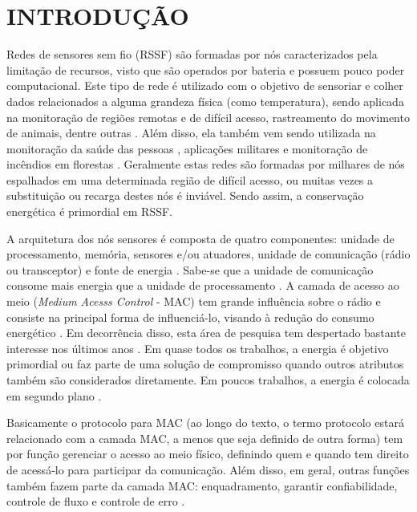 \documentclass[12pt]{article}
\begin{document}
\section{INTRODUÇÃO}
  Redes de sensores sem fio (RSSF) são formadas por nós caracterizados pela limitação de recursos, visto que são operados por bateria e possuem pouco poder computacional. Este tipo de rede é utilizado com o objetivo de sensoriar e colher dados relacionados a alguma grandeza física (como temperatura), sendo aplicada na monitoração de regiões remotas e de difícil acesso, rastreamento do movimento de animais, dentre outras \cite{Santi05a}. Além disso, ela também vem sendo utilizada na monitoração da saúde das pessoas \cite{20103113115754}, aplicações militares \cite{20083811560517} e monitoração de incêndios em florestas \cite{20100312645920}. Geralmente estas redes são formadas por milhares de nós espalhados em uma determinada região de difícil acesso, ou muitas vezes a substituição ou recarga destes nós é inviável. Sendo assim, a conservação energética é primordial em RSSF.

  A arquitetura dos nós sensores é composta de quatro componentes: unidade de processamento, memória, sensores e/ou atuadores, unidade de comunicação (rádio ou transceptor) e fonte de energia \cite{karl05}. Sabe-se que a unidade de comunicação consome mais energia que a unidade de processamento \cite{karl05}. A camada de acesso ao meio (\textit{Medium Acesss Control} - MAC) tem grande influência sobre o rádio e consiste na principal forma de influenciá-lo, visando à redução do consumo energético \cite{kredo07}. Em decorrência disso, esta área de pesquisa tem despertado bastante interesse nos últimos anos \cite{20103113115841,20103813240679,20102613044996,20102813064978,20100812725891,20100312645920,20102012936055,20103113115754,20102613043092,20094112365200,20100512680000,20084511683228,20094012349418,20094212373426,20101312811704,20100312644073,20093112234782,20092812183087,20093812310584,20082211277411,20093812310364,20085211817614,20083811560517,20083811569004,20083911592812,Yadav08,20092612148942,20064010146973,20073110720913}. Em quase todos os trabalhos, a energia é objetivo primordial ou faz parte de uma solução de compromisso quando outros atributos também são considerados diretamente. Em poucos trabalhos, a energia é colocada em segundo plano \cite{20093812310364}.

  Basicamente o protocolo para MAC (ao longo do texto, o termo protocolo estará relacionado com a camada MAC, a menos que seja definido de outra forma) tem por função gerenciar o acesso ao meio físico, definindo quem e quando tem direito de acessá-lo para participar da comunicação. Além disso, em geral, outras funções também fazem parte da camada MAC: enquadramento, garantir confiabilidade, controle de fluxo e controle de erro \cite{kredo07}.
\end{document}
